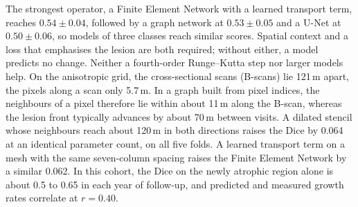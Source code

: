 \begin{abstract*}
The strongest operator, a Finite Element Network with a learned transport
term, reaches $0.54 \pm 0.04$, followed by a graph network at
$0.53 \pm 0.05$ and a U-Net at $0.50 \pm 0.06$, so models of three classes
reach similar scores. Spatial context and a loss that emphasises the lesion
are both required; without either, a model predicts no change. Neither a
fourth-order Runge--Kutta step nor larger models help. On the anisotropic grid, the cross-sectional scans (B-scans)
lie 121\,\textmu{}m apart, the pixels along a scan only
5.7\,\textmu{}m. In a graph
built from pixel indices, the neighbours of a pixel therefore lie within
about 11\,\textmu{}m along the B-scan, whereas the lesion front typically
advances by about 70\,\textmu{}m between visits. A dilated stencil whose
neighbours reach about 120\,\textmu{}m in both directions raises the Dice by
0.064 at an identical parameter count, on all five folds. A learned
transport term on a mesh with the same seven-column spacing raises the
Finite Element Network by a similar 0.062. In this cohort, the Dice on the
newly atrophic region alone is about 0.5 to 0.65 in each year of
follow-up, and predicted and measured growth rates correlate at
$r = 0.40$.
\end{abstract*}




